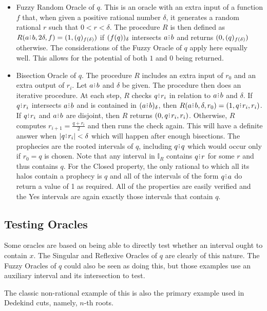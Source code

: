 \documentclass[12pt]{article}
\begin{document}
\begin{itemize}
    \item Fuzzy Random Oracle of $q$. This is an oracle with an extra input of a function $f$ that, when given a positive rational number $\delta$, it generates a random rational $r$ such that $0 < r < \delta$. The procedure $R$ is then defined as $R(a\rint b, 2\delta, f) = (1, \halo[f(\delta)]{q})$ if $\halo{f(q)}$ intersects $a\rint b$ and returns $(0, \halo[f(\delta)]{q})$ otherwise. The considerations of the Fuzzy Oracle of $q$ apply here equally well. This allows for the potential of both $1$ and $0$ being returned. 
    
    \item Bisection Oracle of $q$. The procedure $R$ includes an extra input of $r_0$ and an extra output of $r_i$. Let $a \rint b$ and $\delta$ be given. The procedure then does an iterative procedure.  At each step, $R$ checks $q \rint r_i$ in relation to $a \rint b$ and $\delta$. If $q \rint r_i$ intersects $a \rint b$ and is contained in $\halo{a \rint b}$, then $R(a \rint b, \delta, r_0) = (1, q \rint r_i, r_i)$. If $q \rint r_i$ and $a \rint b$ are disjoint, then $R$ returns $(0, q \rint r_i, r_i)$. Otherwise, $R$ computes $r_{i+1} = \frac{q + r_i}{2}$ and then runs the check again. This will have a definite answer when $|q \rint r_i| < \delta$ which will happen after enough bisections. The prophecies are the rooted intervals of $q$, including $q \rint q$ which would occur only if $r_0 = q$ is chosen. Note that any interval in $\mathbb{I}_R$ contains $q \rint r$ for some $r$ and thus contains $q$. For the Closed property, the only rational to which all its halos contain a prophecy is $q$ and all of the intervals of the form $q \rint a$ do return a value of 1 as required. All of the properties are easily verified and the Yes intervals are again exactly those intervals that contain $q$.
\end{itemize}

\subsection{Testing Oracles}

Some oracles are based on being able to directly test whether an interval ought to contain $x$. The Singular and Reflexive Oracles of $q$ are clearly of this nature. The Fuzzy Oracles of $q$ could also be seen as doing this, but those examples use an auxiliary interval and its intersection to test. 

The classic non-rational example of this is also the primary example used in Dedekind cuts, namely, $n$-th roots. 
\end{document}
